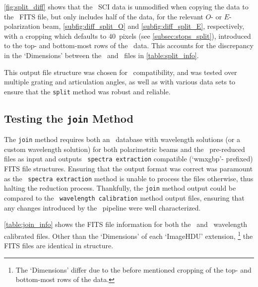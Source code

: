 \autoref{fig:split_diff} shows that the \polsalt\ \gls{SCI} data is unmodified when copying the data to the \stops\ \gls{FITS} file, but only includes half of the data, for the relevant $O$- or $E$-polarization beam, \autoref{subfig:diff_split_O} and \autoref{subfig:diff_split_E}, respectively, with a cropping which defaults to $40$~pixels (see \autoref{subsec:stops_split}), introduced to the top- and bottom-most rows of the \polsalt\ data. This accounts for the discrepancy in the `Dimensions' between the \polsalt\ and \stops\ files in \autoref{table:split_info}.

This output file structure was chosen for \iraf\ compatibility, and was tested over multiple grating and articulation angles, as well as with various data sets to ensure that the \texttt{split} method was robust and reliable.

\subsection{Testing the \texttt{join} Method} \label{subsec:test_join}

The \texttt{join} method requires both an \iraf\ database with wavelength solutions (or a custom wavelength solution) for both polarimetric beams and the \polsalt\ pre-reduced files as input and outputs \polsalt\ \texttt{spectra extraction} compatible (`wmxgbp'- prefixed) \gls{FITS} file structures. Ensuring that the output format was correct was paramount as the \polsalt\ \texttt{spectra extraction} method is unable to process the files otherwise, thus halting the reduction process. Thankfully, the \texttt{join} method output could be compared to the \polsalt\ \texttt{wavelength calibration} method output files, ensuring that any changes introduced by the \stops\ pipeline were well characterized.



\autoref{table:join_info} shows the \gls{FITS} file information for both the \polsalt\ and \stops\ wavelength calibrated files. Other than the `Dimensions' of each `ImageHDU' extension,%
\footnote{The `Dimensions' differ due to the before mentioned cropping of the top- and bottom-most rows of the data.}
the \gls{FITS} files are identical in structure.

